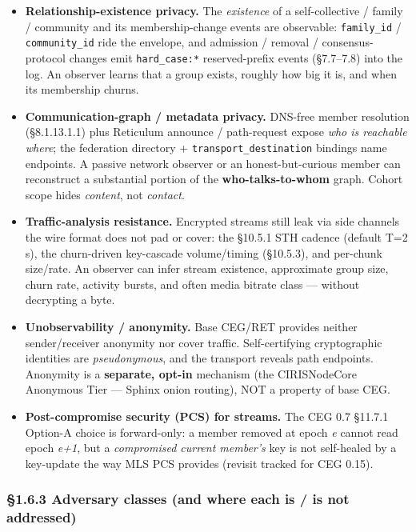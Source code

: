 \documentclass[11pt]{article}
\begin{document}
\begin{itemize}\setlength\itemsep{0pt}
\item \textbf{Relationship-existence privacy.} The \textit{existence} of a self-collective / family / community and its membership-change events are observable: \texttt{family\_id} / \texttt{community\_id} ride the envelope, and admission / removal / consensus-protocol changes emit \texttt{hard\_case:*} reserved-prefix events (§7.7–7.8) into the log. An observer learns that a group exists, roughly how big it is, and when its membership churns.
\item \textbf{Communication-graph / metadata privacy.} DNS-free member resolution (§8.1.13.1.1) plus Reticulum announce / path-request expose \textit{who is reachable where}; the federation directory + \texttt{transport\_destination} bindings name endpoints. A passive network observer or an honest-but-curious member can reconstruct a substantial portion of the \textbf{who-talks-to-whom} graph. Cohort scope hides \textit{content}, not \textit{contact}.
\item \textbf{Traffic-analysis resistance.} Encrypted streams still leak via side channels the wire format does not pad or cover: the §10.5.1 STH cadence (default T=2 s), the churn-driven key-cascade volume/timing (§10.5.3), and per-chunk size/rate. An observer can infer stream existence, approximate group size, churn rate, activity bursts, and often media bitrate class — without decrypting a byte.
\item \textbf{Unobservability / anonymity.} Base CEG/RET provides neither sender/receiver anonymity nor cover traffic. Self-certifying cryptographic identities are \textit{pseudonymous}, and the transport reveals path endpoints. Anonymity is a \textbf{separate, opt-in} mechanism (the CIRISNodeCore Anonymous Tier — Sphinx onion routing), NOT a property of base CEG.
\item \textbf{Post-compromise security (PCS) for streams.} The CEG 0.7 §11.7.1 Option-A choice is forward-only: a member removed at epoch \textit{e} cannot read epoch \textit{e+1}, but a \textit{compromised current member's} key is not self-healed by a key-update the way MLS PCS provides (revisit tracked for CEG 0.15).
\end{itemize}


\subsubsection*{§1.6.3 Adversary classes (and where each is / is not addressed)}
\end{document}
